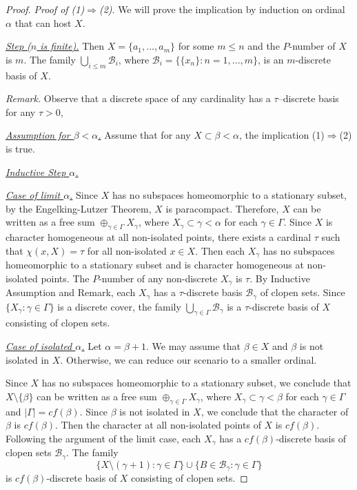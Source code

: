 \documentclass[12pt]{amsart}
\begin{document}
\begin{proof}
{\it Proof of (1)$\Rightarrow$(2)}. We will prove the implication by induction on ordinal $\alpha$ that can host $X$.
\par\bigskip\noindent
\underline {\it Step ($n$ is finite).} Then $X=\{a_1,...,a_m\}$ for some $m\leq n$ and the $P$-number of $X$ is $m$. The family 
$\bigcup_{i\leq m}\mathcal B_i$, where $\mathcal B_i=\{\{x_n\}: n=1,...,m\}$, is an $m$-discrete basis of $X$.

\par\bigskip\noindent
{\it Remark.} Observe that a discrete space of any cardinality has a $\tau$--discrete basis for any $\tau>0$,
\par\bigskip\noindent
\underline {\it Assumption for $\beta<\alpha$.} Assume that for any $X\subset \beta <\alpha$, the implication (1)$\Rightarrow$(2) is true.

\par\bigskip\noindent
\underline{\it Inductive Step $\alpha$.} 

\par\medskip\noindent
\underline {\it Case of limit $\alpha$.} Since $X$ has no subspaces homeomorphic to a stationary subset, by the Engelking-Lutzer Theorem, $X$ is paracompact. Therefore, $X$  can be written as a free sum $\oplus_{\gamma\in \Gamma}X_\gamma$, where $X_\gamma\subset \gamma<\alpha$ for each $\gamma\in \Gamma$. Since $X$ is character homogeneous at all non-isolated points, there exists a cardinal $\tau$ such that
$\chi(x,X)=\tau$ for all non-isolated $x\in X$. Then each $X_\gamma$ has no subspaces homeomorphic to a stationary subset and is character homogeneous at non-isolated points. The $P$-number of any non-discrete $X_\gamma$  is $\tau$. By Inductive Assumption and Remark,  each $X_\gamma$ has a $\tau$-discrete basis $\mathcal B_\gamma$ of clopen sets. Since  $\{X_\gamma:\gamma\in \Gamma\}$ is a discrete cover, the family $\bigcup_{\gamma\in\Gamma}\mathcal B_\gamma$ is a $\tau$-discrete basis of $X$ consisting of clopen sets.  

\par\medskip\noindent
\underline {\it Case of isolated $\alpha$.} Let $\alpha =\beta +1$. We may assume that $\beta\in X$ and $\beta$ is not isolated in $X$. Otherwise, we can reduce our scenario to a smaller ordinal.

Since $X$ has no subspaces homeomorphic to a stationary subset, we conclude that $X\setminus \{\beta\}$ can be written as a free sum $\oplus_{\gamma\in \Gamma}X_\gamma$, where $X_\gamma\subset \gamma<\beta$ for each $\gamma\in \Gamma$
and $|\Gamma |=cf(\beta )$. Since $\beta$ is not isolated in $X$, we conclude that the character of $\beta$ is $cf(\beta)$. Then the character at all non-isolated points of $X$ is $cf(\beta)$. Following the argument of the limit case,  each $X_\gamma$ has a $cf(\beta)$-discrete basis of clopen sets $\mathcal B_\gamma$.  The family 
$$
\{X\setminus (\gamma + 1):\gamma\in \Gamma\}\cup  \{B\in \mathcal B_\gamma:\gamma\in \Gamma\}
$$
is $cf(\beta)$-discrete basis of $X$ consisting of clopen sets.  


\end{proof}
\end{document}
